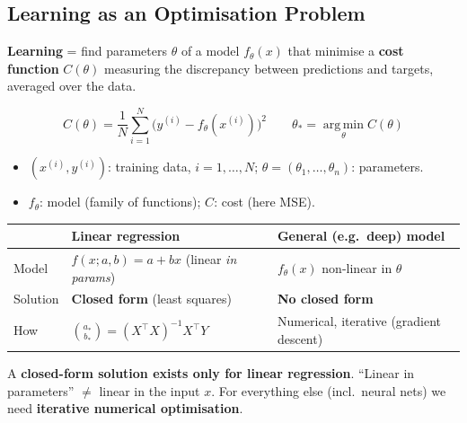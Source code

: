\documentclass[10pt,a4paper]{article}
\begin{document}
	\subsection{Learning as an Optimisation Problem}

	\begin{definitionbox}
		\textbf{Learning} = find parameters $\theta$ of a model $f_\theta(x)$ that minimise a \textbf{cost function} $C(\theta)$ measuring the discrepancy between predictions and targets, averaged over the data.
	\end{definitionbox}

	\begin{formulabox}
		\[
		C(\theta) = \frac{1}{N}\sum_{i=1}^{N} \big(y^{(i)} - f_\theta(x^{(i)})\big)^2
		\qquad \theta_* = \operatorname*{arg\,min}_\theta C(\theta)
		\]
	\end{formulabox}
	\begin{itemize}[leftmargin=*]
		\item $(x^{(i)}, y^{(i)})$: training data, $i=1,\dots,N$; \quad $\theta=(\theta_1,\dots,\theta_n)$: parameters.
		\item $f_\theta$: model (family of functions); \quad $C$: cost (here MSE).
	\end{itemize}

	\begin{center}
		\begin{tabular}{p{3.3cm} p{6.2cm} p{6.2cm}}
			\toprule
			& \textbf{Linear regression} & \textbf{General (e.g.\ deep) model} \\
			\midrule
			Model       & $f(x;a,b)=a+bx$ (linear \emph{in params}) & $f_\theta(x)$ non-linear in $\theta$ \\
			Solution    & \textbf{Closed form} (least squares) & \textbf{No closed form} \\
			How         & $\binom{a_*}{b_*}=(X^\top X)^{-1}X^\top Y$ & Numerical, iterative (gradient descent) \\
			\bottomrule
		\end{tabular}
	\end{center}

	\begin{importantbox}
		A \textbf{closed-form solution exists only for linear regression}. ``Linear in parameters'' $\neq$ linear in the input $x$. For everything else (incl.\ neural nets) we need \textbf{iterative numerical optimisation}.
	\end{importantbox}
\end{document}
